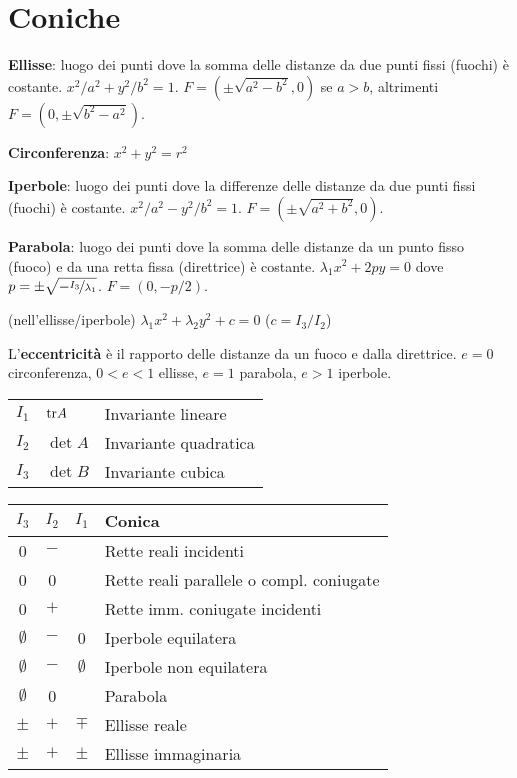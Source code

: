 \section{Coniche}

\textbf{Ellisse}: luogo dei punti dove la somma delle distanze da due punti fissi (fuochi) è costante. $x^2/a^2 + y^2/b^2 = 1$.
$F=(\pm\sqrt{a^2-b^2}, 0)$ se $a>b$, altrimenti $F=(0, \pm\sqrt{b^2-a^2})$.

\textbf{Circonferenza}: $x^2+y^2=r^2$

\textbf{Iperbole}: luogo dei punti dove la differenze delle distanze da due punti fissi (fuochi) è costante. $x^2/a^2 - y^2/b^2 = 1$.
$F=(\pm\sqrt{a^2+b^2}, 0)$.

\textbf{Parabola}: luogo dei punti dove la somma delle distanze da un punto fisso (fuoco) e da una retta fissa (direttrice) è costante. $\lambda_1x^2+2py=0$ dove $p=\pm \sqrt{-\nicefrac{I_3}{\lambda_1}}$.
$F=(0, -p/2)$.

(nell'ellisse/iperbole) $\lambda_1x^2+\lambda_2y^2+c=0$ ($c=I_3/I_2$)

L'\textbf{eccentricità} è il rapporto delle distanze da un fuoco e dalla direttrice. $e = 0$ circonferenza, $0 < e < 1$ ellisse, $e = 1$ parabola, $e > 1$ iperbole. 

\begin{tabular}{lll}
	$I_1$ & $\mathrm{tr} A$ & Invariante lineare \\
	$I_2$ & $\det A$ & Invariante quadratica \\
	$I_3$ & $\det B$ & Invariante cubica
\end{tabular}

\begin{tabular}{c|c|c|l}
	\boldmath$I_3$ & \boldmath$I_2$ & \boldmath$I_1$ & \textbf{Conica} \\
	\hline
	0           & $-$   &       & Rette reali incidenti \\
	0           & 0     &       & Rette reali parallele o compl. coniugate \\
	0           & $+$   &       & Rette imm. coniugate incidenti \\
	\hline
	$\emptyset$ & $-$   & 0     & Iperbole equilatera \\
	$\emptyset$ & $-$   & $\emptyset$ & Iperbole non equilatera \\
	$\emptyset$ & 0     &       & Parabola \\
	$\pm$       & $+$   & $\mp$ & Ellisse reale \\
	$\pm$       & $+$   & $\pm$ & Ellisse immaginaria \\
	\hline
\end{tabular}

